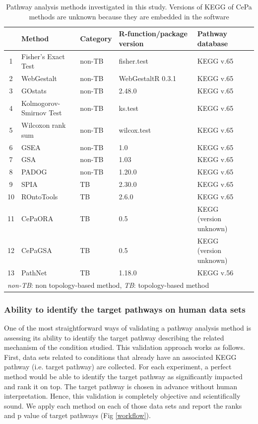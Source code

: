 \begin{table}

\centering
\caption{Pathway analysis methods investigated in this study. Versions of KEGG of CePa methods are unknown because they are embedded in the software\label{table:PAmethods}} 
\small
\begin{tabular}{@{}clllll@{}}\hline
 & Method & Category  & R-function/package version & Pathway database \\\hline
1 & Fisher's Exact Test &	non-TB 	& fisher.test & KEGG v.65\\ 
2 & WebGestalt &	non-TB 	& WebGestaltR 0.3.1 & KEGG v.65\\ 
3 & GOstats &	non-TB 	&2.48.0 & KEGG v.65\\ 
4 & Kolmogorov-Smirnov Test& non-TB & ks.test & KEGG v.65\\
5 & Wilcoxon rank sum	& non-TB 	& wilcox.test &  KEGG v.65\\
6 & GSEA &	non-TB & 1.0 & KEGG v.65\\
7 & GSA &	non-TB & 1.03 & KEGG v.65\\
8 & PADOG &	non-TB & 1.20.0 & KEGG v.65\\
9 & SPIA &	TB  & 2.30.0 & KEGG v.65\\
10 & ROntoTools &		TB & 2.6.0 & KEGG v.65\\
11 & CePaORA &	TB & 0.5 & KEGG (version unknown)\\
12 & CePaGSA &	TB & 0.5 & KEGG (version unknown)\\
13 & PathNet &	TB & 1.18.0 & KEGG v.56\\
\hline
\multicolumn{5}{l}{\textit{non-TB}: non topology-based method, \textit{TB}: topology-based method}

\end{tabular}
\end{table}


\subsubsection{Ability to identify the target pathways on human data sets}

One of the most straightforward ways of validating a pathway analysis method is assessing its ability to identify the target pathway describing the related mechanism of the condition studied. 
This validation approach works as follows. First, data sets related to  conditions that already have an associated KEGG pathway (i.e. target pathway) are collected. For each experiment, a perfect method would be able to identify the target pathway as significantly impacted and rank it on top. The target pathway is chosen in advance without human interpretation. Hence, this validation is completely objective and scientifically sound. We apply each method on each of those data sets and report the ranks and p value of target pathways (Fig \ref{workflow}).


